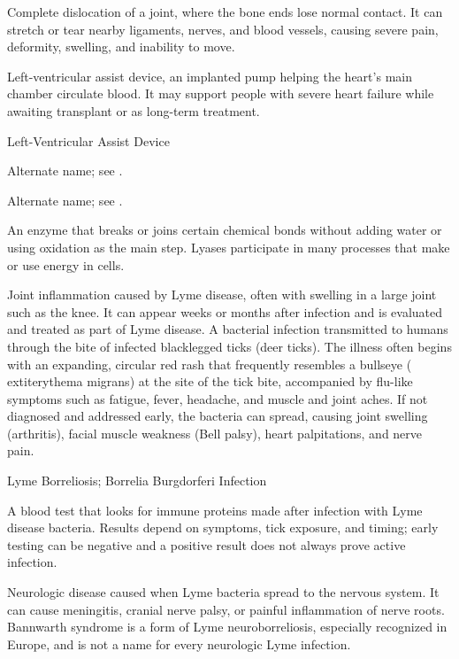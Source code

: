  Complete dislocation of a joint, where the bone ends lose normal contact. It can stretch or tear nearby ligaments, nerves, and blood vessels, causing severe pain, deformity, swelling, and inability to move.

 Left-ventricular assist device, an implanted pump helping the heart’s main chamber circulate blood. It may support people with severe heart failure while awaiting transplant or as long-term treatment.

\synonyms
Left-Ventricular Assist Device

 Alternate name; see .

 Alternate name; see .

 An enzyme that breaks or joins certain chemical bonds without adding water or using oxidation as the main step. Lyases participate in many processes that make or use energy in cells.

 Joint inflammation caused by Lyme disease, often with swelling in a large joint such as the knee. It can appear weeks or months after infection and is evaluated and treated as part of Lyme disease.
 A bacterial infection transmitted to humans through the bite of infected blacklegged ticks (deer ticks). The illness often begins with an expanding, circular red rash that frequently resembles a bullseye ( extit{erythema migrans}) at the site of the tick bite, accompanied by flu-like symptoms such as fatigue, fever, headache, and muscle and joint aches. If not diagnosed and addressed early, the bacteria can spread, causing joint swelling (arthritis), facial muscle weakness (Bell palsy), heart palpitations, and nerve pain.

\synonyms
Lyme Borreliosis; Borrelia Burgdorferi Infection

 A blood test that looks for immune proteins made after infection with Lyme disease bacteria. Results depend on symptoms, tick exposure, and timing; early testing can be negative and a positive result does not always prove active infection.

 Neurologic disease caused when Lyme bacteria spread to the nervous system. It can cause meningitis, cranial nerve palsy, or painful inflammation of nerve roots. Bannwarth syndrome is a form of Lyme neuroborreliosis, especially recognized in Europe, and is not a name for every neurologic Lyme infection.

